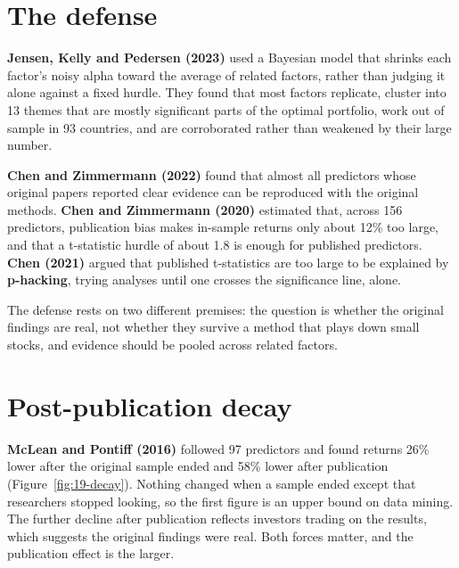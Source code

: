 \section{The defense}
\label{sec:19-defense}

\textbf{Jensen, Kelly and Pedersen (2023)} used a Bayesian model that shrinks each factor's noisy alpha toward the average of related factors, rather than judging it alone against a fixed hurdle. They found that most factors replicate, cluster into 13 themes that are mostly significant parts of the optimal portfolio, work out of sample in 93 countries, and are corroborated rather than weakened by their large number.

\textbf{Chen and Zimmermann (2022)} found that almost all predictors whose original papers reported clear evidence can be reproduced with the original methods. \textbf{Chen and Zimmermann (2020)} estimated that, across 156 predictors, publication bias makes in-sample returns only about 12\% too large, and that a t-statistic hurdle of about 1.8 is enough for published predictors. \textbf{Chen (2021)} argued that published t-statistics are too large to be explained by \textbf{p-hacking}, trying analyses until one crosses the significance line, alone.

The defense rests on two different premises: the question is whether the original findings are real, not whether they survive a method that plays down small stocks, and evidence should be pooled across related factors.

\section{Post-publication decay}
\label{sec:19-decay}

\textbf{McLean and Pontiff (2016)} followed 97 predictors and found returns 26\% lower after the original sample ended and 58\% lower after publication (Figure~\ref{fig:19-decay}). Nothing changed when a sample ended except that researchers stopped looking, so the first figure is an upper bound on data mining. The further decline after publication reflects investors trading on the results, which suggests the original findings were real. Both forces matter, and the publication effect is the larger.

